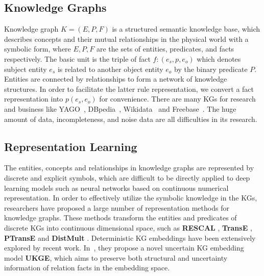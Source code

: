 \documentclass{article}
\begin{document}
	\subsection{Knowledge Graphs}
	Knowledge graph $K = (E, P , F)$ is a structured semantic knowledge base, which describes concepts and their mutual relationships in the physical world with a symbolic form, where $E, P, F$ are the  sets of entities, predicates, and facts respectively. The basic unit is the triple of fact $f: (e_s, p, e_o)$ which denotes subject entity $e_s$ is related to another object entity $e_o$ by the binary predicate $P$. Entities are connected by relationships to form a network of knowledge structures. In order to facilitate the latter rule representation, we convert a fact representation into $p(e_s, e_o)$ for convenience. 
	There are many KGs for research and business like YAGO~\cite{Yago}, DBpedia~\cite{Dbpedia}, Wikidata~\cite{Wikidata} and Freebase~\cite{Freebase}.
	The huge amount of data, incompleteness, and noise data are all difficulties in its research.
	 
	
	\subsection{Representation Learning}
	The entities, concepts and relationships in knowledge graphs are represented by discrete and explicit symbols, which are difficult to be directly applied to deep learning models such as neural networks based on continuous numerical representation. 
	In order to effectively utilize the symbolic knowledge in the KGs, researchers have proposed a large number of representation methods for knowledge graphs. These methods transform the entities and predicates of discrete KGs into continuous dimensional space, such as {\bf RESCAL} \cite{Nickel:RESCAL}, {\bf TransE} \cite{Bordes:transe}, {\bf PTransE} \cite{Liu:ptranse} and {\bf DistMult} \cite{Yang:2015}. Deterministic KG embeddings have been extensively explored by recent work. In~\cite{UKG2018}, they propose a novel uncertain KG embedding model {\bf UKGE}, which aims to preserve both structural and uncertainty information of relation facts in the embedding space. 
\end{document}
